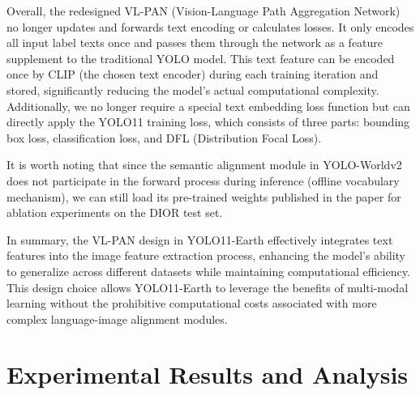 \documentclass{article}
\begin{document}
Overall, the redesigned VL-PAN (Vision-Language Path Aggregation Network)
no longer updates and forwards text encoding or calculates losses.
It only encodes all input label texts once and passes them through the network
as a feature supplement to the traditional YOLO model. This text feature can
be encoded once by CLIP (the chosen text encoder) during each training iteration
and stored, significantly reducing the model’s actual computational complexity.
Additionally, we no longer require a special text embedding loss function but
can directly apply the YOLO11 training loss, which consists of three parts:
bounding box loss, classification loss, and DFL (Distribution Focal Loss).

It is worth noting that since the semantic alignment module in YOLO-Worldv2 does
not participate in the forward process during inference (offline vocabulary mechanism),
we can still load its pre-trained weights published in the paper for ablation experiments
on the DIOR test set.

In summary, the VL-PAN design in YOLO11-Earth effectively integrates text features into the
image feature extraction process, enhancing the model’s ability to generalize across
different datasets while maintaining computational efficiency. This design choice
allows YOLO11-Earth to leverage the benefits of multi-modal learning without the prohibitive
computational costs associated with more complex language-image alignment modules.

\section{Experimental Results and Analysis}
\end{document}

